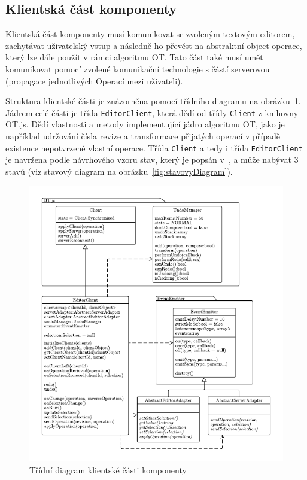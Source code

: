 

\subsection{Klientská část komponenty}\label{subsec:klientskáČást}

Klientská část komponenty musí komunikovat se zvoleným textovým editorem, zachytávat uživatelský vstup a následně ho převést na abstraktní object operace, který lze dále použít v rámci algoritmu \gls{OT}.
Tato část také musí umět komunikovat pomocí zvolené komunikační technologie s částí serverovou (propagace jednotlivých Operací mezi uživateli).

Struktura klientské části je znázorněna pomocí třídního diagramu na obrázku~\ref{fig:EditorClient}.
Jádrem celé části je třída \texttt{EditorClient}, která dědí od třídy \texttt{Client} z knihovny OT.js.
Dědí vlastnosti a metody implementující jádro algoritmu \gls{OT}, jako je například udržování čísla revize a transformace přijatých operací v případě existence nepotvrzené vlastní operace.
Třída \texttt{Client} a tedy i třída \texttt{EditorClient} je navržena podle návrhového vzoru stav, který je popsán v~\cite[str.~283]{gof:patterns}, a může nabývat 3 stavů (viz stavový diagram na obrázku~\ref{fig:stavovyDiagram}).

\begin{figure}[ht!]
    \centering
    \includegraphics[width=\textwidth]{partials/navrh/editor/EditorClient.pdf}
    \caption{Třídní diagram klientské části komponenty}\label{fig:EditorClient}
\end{figure}

